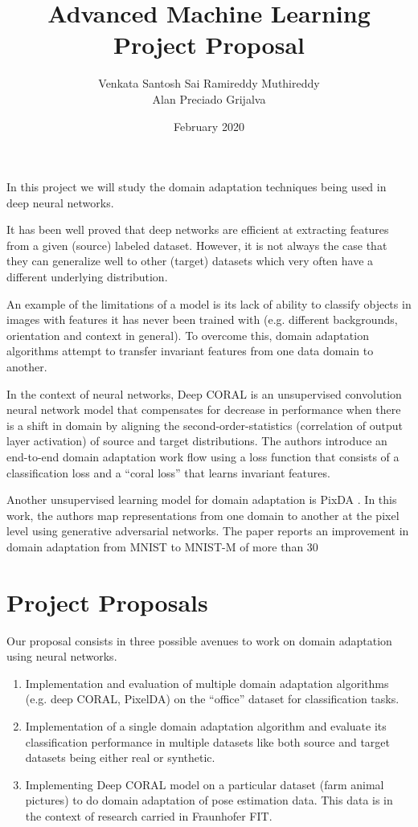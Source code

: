 \documentclass[12pt]{extarticle}
\title{Advanced Machine Learning \\ Project Proposal}
\author{Venkata Santosh Sai Ramireddy Muthireddy \\ \newline Alan Preciado Grijalva}
\date{February 2020}
\begin{document}
\maketitle

In this project we will study the  domain adaptation techniques being used in deep neural networks. 

It has been well proved that deep networks are efficient at extracting features from a given (source) labeled dataset. However, it is not always the case that they can generalize well to other (target) datasets which very often have a different underlying distribution.

An example of the limitations of a model is its lack of ability to classify objects in images with features it has never been trained with (e.g. different backgrounds, orientation and context in general). To overcome this, domain adaptation algorithms attempt to transfer invariant features from one data domain to another. 

In the context of neural networks, Deep CORAL \cite{sun2016deep} is an unsupervised convolution neural network  model that compensates for decrease in performance when there is a shift in domain by aligning the second-order-statistics (correlation of output layer activation) of source and target distributions. The authors introduce an end-to-end domain adaptation work flow using a loss function that consists of a classification loss and a “coral loss” that learns invariant features.

Another unsupervised learning model for domain adaptation is PixDA \cite{bousmalis2017unsupervised}. In this work, the authors map representations from one domain to another at the pixel level using generative adversarial networks. The paper reports an improvement in domain adaptation from MNIST to MNIST-M of more than 30%

\section{Project Proposals}
Our proposal consists in three possible avenues to work on domain adaptation using neural networks. 
\begin{enumerate}

\item Implementation and evaluation of multiple domain adaptation algorithms (e.g. deep CORAL, PixelDA) on the “office” dataset for classification tasks. 
    \item Implementation of a single domain adaptation algorithm and evaluate its classification performance in multiple datasets like both source and target datasets being either real or synthetic.
    \item Implementing Deep CORAL model on a particular dataset (farm animal pictures) to do domain adaptation of pose estimation data. This data is in the context of research carried in Fraunhofer FIT.
\end{enumerate}


\end{document}
